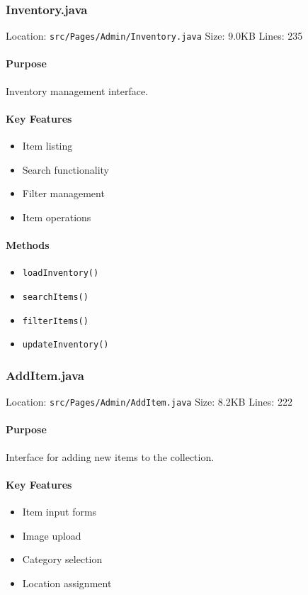 \documentclass[12pt,a4paper]{article}
\begin{document}
\subsubsection{Inventory.java}
Location: \texttt{src/Pages/Admin/Inventory.java}
Size: 9.0KB
Lines: 235

\paragraph{Purpose}
Inventory management interface.

\paragraph{Key Features}
\begin{itemize}
    \item Item listing
    \item Search functionality
    \item Filter management
    \item Item operations
\end{itemize}

\paragraph{Methods}
\begin{itemize}
    \item \texttt{loadInventory()}
    \item \texttt{searchItems()}
    \item \texttt{filterItems()}
    \item \texttt{updateInventory()}
\end{itemize}

\subsubsection{AddItem.java}
Location: \texttt{src/Pages/Admin/AddItem.java}
Size: 8.2KB
Lines: 222

\paragraph{Purpose}
Interface for adding new items to the collection.

\paragraph{Key Features}
\begin{itemize}
    \item Item input forms
    \item Image upload
    \item Category selection
    \item Location assignment
\end{itemize}
\end{document}
